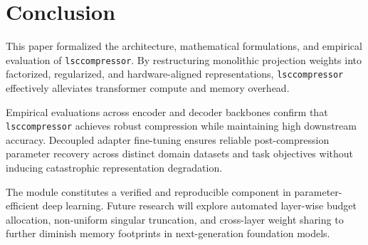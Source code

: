 \section{Conclusion}
This paper formalized the architecture, mathematical formulations, and empirical evaluation of \texttt{lsccompressor}. By restructuring monolithic projection weights into factorized, regularized, and hardware-aligned representations, \texttt{lsccompressor} effectively alleviates transformer compute and memory overhead.

Empirical evaluations across encoder and decoder backbones confirm that \texttt{lsccompressor} achieves robust compression while maintaining high downstream accuracy. Decoupled adapter fine-tuning ensures reliable post-compression parameter recovery across distinct domain datasets and task objectives without inducing catastrophic representation degradation.

The module constitutes a verified and reproducible component in parameter-efficient deep learning. Future research will explore automated layer-wise budget allocation, non-uniform singular truncation, and cross-layer weight sharing to further diminish memory footprints in next-generation foundation models.
